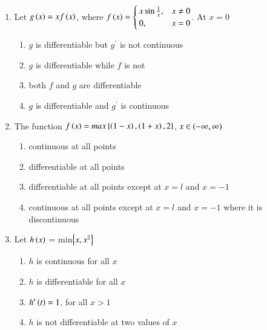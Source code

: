 \documentclass[journal]{IEEEtran}
\numberwithin{equation}{enumi}
\numberwithin{figure}{enumi}
\begin{document}
\begin{enumerate}
    \item 
    Let $g\left(x\right)=xf\left(x\right)$, where $f\left(x\right) = \begin{cases}
        x\sin\frac{1}{x}, & x\neq 0\\
        0, & x=0
    \end{cases}$. At $x=0$ 
	
    \hfill{}
    
    \begin{enumerate}
      	\item $g$ is differentiable but $g^{\prime}$ is not continuous
        \item $g$ is differentiable while $f$ is not
        \item both $f$ and $g$ are differentiable
	\item $g$ is differentiable and $g^{\prime}$ is continuous 
    \end{enumerate}

    \item 
    The function $f\left(x\right) = max\left\{\left(1-x\right),\left(1+x\right),2\right\}$, $x\in \left(-\infty,\infty\right)$  

    \hfill{}
    
    \begin{enumerate}    
        \item continuous at all points
        \item differentiable at all points
        \item differentiable at all points except at $x=l$ and $x=-1$
        \item continuous at all points except at $x=l$ and $x=-1$ where it is discontinuous
    \end{enumerate}

    \item 
    Let $h\left(x\right)$ = min$\left\{x,x^{2}\right\}$ 
    
    \hfill{}

    \begin{enumerate}
	\item $h$ is continuous for all $x$
        \item $h$ is differentiable for all $x$
	\item $h^{\prime}\left(t\right)=1$, for all $x>1$
        \item $h$ is not differentiable at two values of $x$
    \end{enumerate}


\end{enumerate}
\end{document}
